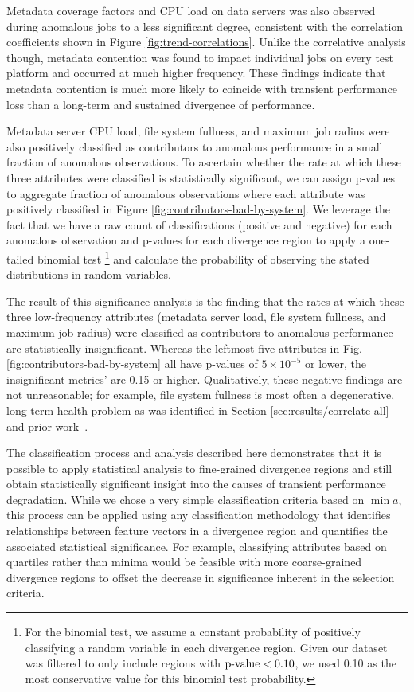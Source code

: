 Metadata coverage factors and CPU load on data servers was also observed during anomalous jobs to a less significant degree, consistent with the correlation coefficients shown in Figure \ref{fig:trend-correlations}.
Unlike the correlative analysis though, metadata contention was found to impact individual jobs on every test platform and occurred at much higher frequency.
These findings indicate that metadata contention is much more likely to coincide with transient performance loss than a long-term and sustained divergence of performance.

Metadata server CPU load, file system fullness, and maximum job radius were also positively classified as contributors to anomalous performance in a small fraction of anomalous observations.
To ascertain whether the rate at which these three attributes were classified is statistically significant, we can assign p-values to aggregate fraction of anomalous observations where each attribute was positively classified in Figure \ref{fig:contributors-bad-by-system}.
We leverage the fact that we have a raw count of classifications (positive and negative) for each anomalous observation and p-values for each divergence region to apply a one-tailed binomial test
   \footnote{For the binomial test, we assume a constant probability of positively classifying a random variable in each divergence region.
   Given our dataset was filtered to only include regions with $\textup{p-value} < 0.10$, we used 0.10 as the most conservative value for this binomial test probability.}
and calculate the probability of observing the stated distributions in random variables.

The result of this significance analysis is the finding that the rates at which these three low-frequency attributes (metadata server load, file system fullness, and maximum job radius) were classified as contributors to anomalous performance are statistically insignificant.
Whereas the leftmost five attributes in Fig. \ref{fig:contributors-bad-by-system} all have p-values of ${5 \times 10^{-5}}$ or lower, the insignificant metrics' are 0.15 or higher.
Qualitatively, these negative findings are not unreasonable; for example, file system fullness is most often a degenerative, long-term health problem as was identified in Section \ref{sec:results/correlate-all} and prior work~\cite{oral2014best,Lockwood2017}.

The classification process and analysis described here demonstrates that it is possible to apply statistical analysis to fine-grained divergence regions and still obtain statistically significant insight into the causes of transient performance degradation.
While we chose a very simple classification criteria based on $\min{a}$, this process can be applied using any classification methodology that identifies relationships between feature vectors in a divergence region and quantifies the associated statistical significance.
For example, classifying attributes based on quartiles rather than minima would be feasible with more coarse-grained divergence regions to offset the decrease in significance inherent in the selection criteria.

